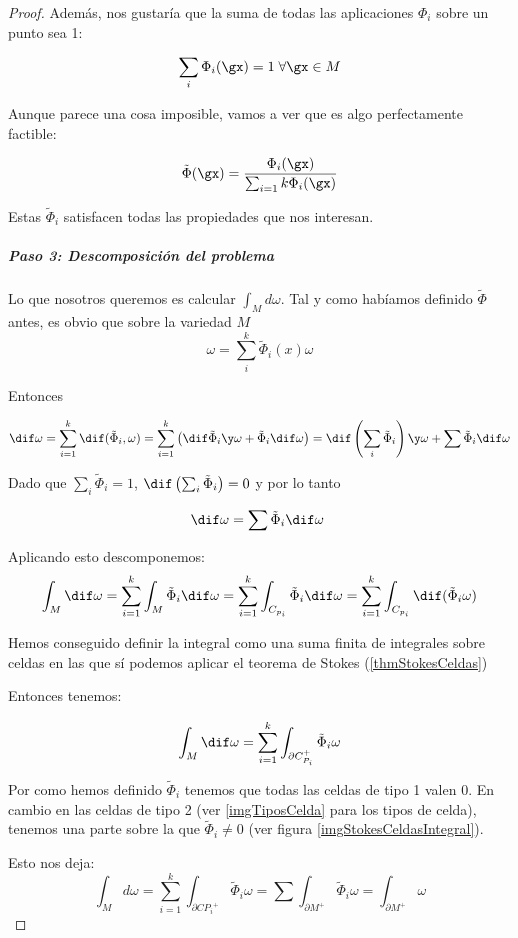 \begin{proof}
Además, nos gustaría que la suma de todas las aplicaciones $Φ_i$ sobre un punto sea 1:

\[ \sum_i \Phi_{i}(\gx) = 1\;\forall \gx \in M\]

Aunque parece una cosa imposible, vamos a ver que es algo perfectamente factible:

\[\tilde{\Phi}(\gx) = \frac{\Phi_i (\gx)}{\sum_{i=1}{k}\Phi_i(\gx)}\]

Estas $\tilde{\Phi}_i$ satisfacen todas las propiedades que nos interesan.

\subparagraph{Paso 3: Descomposición del problema}

Lo que nosotros queremos es calcular $\int_M d\omega$. Tal y como habíamos definido $\tilde{Φ}$ antes, es obvio que sobre la variedad $M$ 
\[ \omega=\sum_i^k\tilde{\Phi}_i(x)\omega \]

Entonces 

\[\dif \omega = \sum_{i=1}^k \dif (\tilde{\Phi}_i,\omega) = \sum_{i=1}^k \left( \dif \tilde{\Phi}_i\y \omega + \tilde{\Phi}_i \dif \omega \right) =  \dif\left(\sum_i \tilde{\Phi}_i\right) \y \omega + \sum \tilde{\Phi}_i \dif \omega\]

Dado que $\sum_i \tilde{Φ}_i = 1$, $\dif\left(\sum_i \tilde{\Phi}_i\right) = 0$ y por lo tanto

\[ \dif \omega = \sum \tilde{\Phi}_i \dif \omega \]

Aplicando esto descomponemos:
\[\int_M \dif \omega = \sum_{i=1}^k \int_M \tilde{\Phi}_i \dif\omega = \sum_{i=1}^k \int_{C_{p_i}} \tilde{\Phi}_i \dif\omega=\sum_{i=1}^k \int_{C_{p_i}} \dif(\tilde{\Phi}_i\omega)
\]

Hemos conseguido definir la integral como una suma finita de integrales sobre celdas en las que sí podemos aplicar el teorema de Stokes (\ref{thmStokesCeldas})

Entonces tenemos:

\[\int_M \dif \omega = \sum_{i=1}^k \int_{\partial  C_{P_i}^{+}} \tilde{\Phi}_i\omega\]

Por como hemos definido $\tilde{\Phi}_i$ tenemos que todas las celdas de tipo 1 valen 0. En cambio en las celdas de tipo 2 (ver \ref{imgTiposCelda} para los tipos de celda), tenemos una parte sobre la que $\tilde{\Phi}_i \neq 0$ (ver figura \ref{imgStokesCeldasIntegral}).

Esto nos deja: \[\int_M d\omega = \sum_{i=1}^k \int_{\partial  C{P_i}^{+}} \tilde{\Phi}_i\omega = \sum \int_{\partial M^+} \tilde{\Phi}_i \omega = \int_{\partial M^+} \omega\]

\end{proof}

